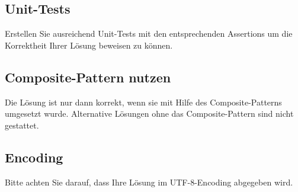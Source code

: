 \documentclass[oneside,a4paper]{scrartcl}
\begin{document}
\subsection*{Unit-Tests}
Erstellen Sie ausreichend Unit-Tests mit den entsprechenden Assertions um die Korrektheit Ihrer Lösung
beweisen zu können.

\subsection*{Composite-Pattern nutzen}
Die Lösung ist nur dann korrekt, wenn sie mit Hilfe des Composite-Patterns umgesetzt wurde. Alternative Lösungen
ohne das Composite-Pattern sind nicht gestattet. 

\subsection*{Encoding}
Bitte achten Sie darauf, dass Ihre Lösung im UTF-8-Encoding abgegeben wird.
\end{document}
